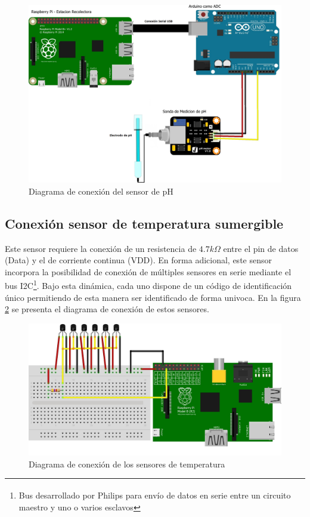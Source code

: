         \begin{figure}[h]
            \centering
            \includegraphics[scale=0.25]{hardware/DiagramaSensordepH_bb2.jpg}
            \caption{Diagrama de conexión del sensor de pH}
            \label{fig:ConexionSensorpH}
        \end{figure}

    \subsection{Conexión sensor de temperatura sumergible}

        \par Este sensor requiere la conexión de un resistencia de $4.7k\Omega$ entre el pin de datos (Data) y el de corriente continua (VDD). En forma adicional, este sensor incorpora la posibilidad de conexión de múltiples sensores en serie mediante el bus I2C\footnote{Bus desarrollado por Philips\textsuperscript{\textregistered} para envío de datos en serie entre un circuito maestro y uno o varios esclavos}. Bajo esta dinámica, cada uno dispone de un código de identificación único permitiendo de esta manera ser identificado de forma univoca. En la figura \ref{fig:ConexionTemperatura} se presenta el diagrama de conexión de estos sensores.
        
        \begin{figure}[h]
            \centering
            \includegraphics[scale = 0.8]{DiagramaSensordeTemp_bb.jpg}
            \caption{Diagrama de conexión de los sensores de temperatura}
            \label{fig:ConexionTemperatura}
        \end{figure}
        
